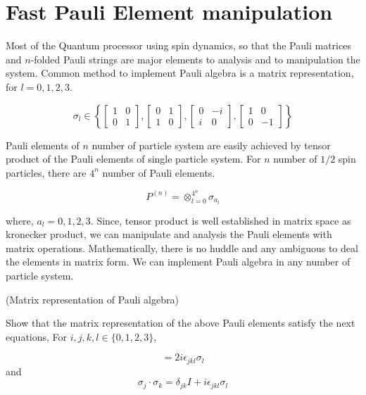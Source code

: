 \chapter{Fast Pauli Element manipulation}
\label{appendix:FPPM}

Most of the Quantum processor using spin dynamics, so that the Pauli matrices and 
$n$-folded Pauli strings are major elements to analysis and to manipulation the system.
Common method to implement Pauli algebra is a matrix representation, for $l= 0, 1, 2, 3$.

\begin{equation*}
    \sigma_l \in \left\{ \begin{bmatrix} 1& 0 \\ 0 &1\end{bmatrix}, 
    \begin{bmatrix} 0& 1 \\ 1 &0\end{bmatrix},
    \begin{bmatrix} 0& -i \\ i &0\end{bmatrix},
    \begin{bmatrix} 1& 0 \\ 0 &-1\end{bmatrix} \right\}
\end{equation*}

Pauli elements of $n$ number of particle system are easily achieved by tensor product of the 
Pauli elements of single particle system. For $n$ number of $1/2$ spin particles, there are $4^n$ number of Pauli elements.

\begin{equation*}
    P^{(n)} = \otimes_{l=0}^{4^n} \sigma_{a_l}
\end{equation*}

where, $a_l = 0, 1, 2, 3$.
Since, tensor product is well established in matrix space as kronecker product,
we can manipulate and analysis the Pauli elements with matrix operations.
Mathematically, there is no huddle and any ambiguous to deal the elements in matrix form.
We can implement Pauli algebra in any number of particle system.

\begin{exercise}(Matrix representation of Pauli algebra)

    Show that the matrix representation of the above Pauli elements satisfy the next equations,
    For $i,j,k,l \in \{0, 1, 2, 3\}$,

    \begin{equation*}
        [\sigma_j, \sigma_k] = 2 i \epsilon_{jkl} \sigma_l
    \end{equation*}
    and
    \begin{equation*}
        \sigma_j \cdot \sigma_k = \delta_{jk} I + i  \epsilon_{jkl} \sigma_l
    \end{equation*}
\end{exercise}


